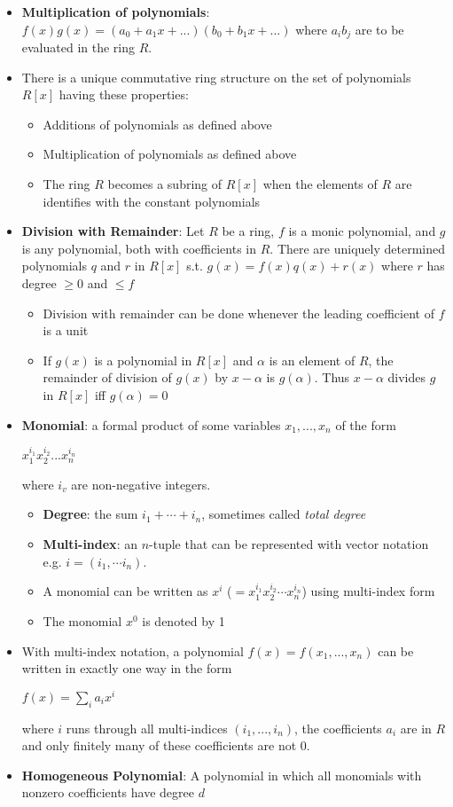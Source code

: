\documentclass[12pt]{article}
\begin{document}
\begin{itemize}
  \item \textbf{Multiplication of polynomials}: $f(x)g(x) = (a_0 + a_1x + ...)(b_0 + b_1x + ...)$ where $a_ib_j$ are to be evaluated in the ring $R$.
  \item There is a unique commutative ring structure on the set of polynomials $R[x]$ having these properties:
  \begin{itemize}
    \item Additions of polynomials as defined above
    \item Multiplication of polynomials as defined above
    \item The ring $R$ becomes a subring of $R[x]$ when the elements of $R$ are identifies with the constant polynomials
  \end{itemize}
  \item \textbf{Division with Remainder}: Let $R$ be a ring, $f$ is a monic polynomial, and $g$ is any polynomial, both with coefficients in $R$. There are uniquely determined polynomials $q$ and $r$ in $R[x]$ s.t. $g(x) = f(x)q(x) + r(x)$ where $r$ has degree $\geqslant 0$ and $\leqslant f$
  \begin{itemize}
    \item Division with remainder can be done whenever the leading coefficient of $f$ is a unit
    \item If $g(x)$ is a polynomial in $R[x]$ and $\alpha$ is an element of $R$, the remainder of division of $g(x)$ by $x - \alpha$ is $g(\alpha)$. Thus $x - \alpha$ divides $g$ in $R[x]$ iff $g(\alpha) = 0$
  \end{itemize}
  \item \textbf{Monomial}: a formal product of some variables $x_1, ..., x_n$ of the form
  \begin{center}
    $x_1^{i_1}x_2^{i_2}...x_n^{i_n}$
  \end{center}
  where $i_v$ are non-negative integers.
  \begin{itemize}
    \item \textbf{Degree}: the sum $i_1 + \cdots + i_n$, sometimes called \textit{total degree}
    \item \textbf{Multi-index}: an $n$-tuple that can be represented with vector notation e.g.  $i = (i_1, \cdots i_n)$.
    \item A monomial can be written as $x^i$ ($= x_1^{i_1}x_2^{i_2} \cdots x_n^{i_n}$) using multi-index form
    \item The monomial $x^0$ is denoted by 1
  \end{itemize}
  \item With multi-index notation, a polynomial $f(x) = f(x_1, ..., x_n)$ can be written in exactly one way in the form
  \begin{center}
    $f(x) = \sum\limits_ia_ix^i$
  \end{center}
  where $i$ runs through all multi-indices $(i_1, ..., i_n)$, the coefficients $a_i$ are in $R$ and only finitely many of these coefficients are not 0.
  \item \textbf{Homogeneous Polynomial}: A polynomial in which all monomials with nonzero coefficients have degree $d$
\end{itemize}
\end{document}
